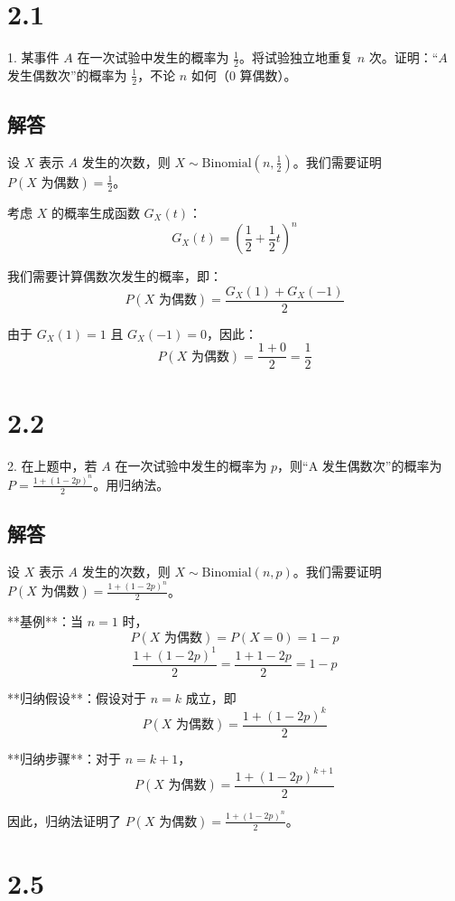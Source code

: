\documentclass[UTF8]{report}
\theoremstyle{MyLineTheoremStyle} %
\theoremstyle{MyBlockTheoremStyle} %
\theoremstyle{MySubsubsectionStyle} %
\begin{document}
\section{2.1}

1. 某事件 \(A\) 在一次试验中发生的概率为 \(\frac{1}{2}\)。将试验独立地重复 \(n\) 次。证明：“\(A\) 发生偶数次”的概率为 \(\frac{1}{2}\)，不论 \(n\) 如何（0 算偶数）。

\subsection*{解答}

设 \(X\) 表示 \(A\) 发生的次数，则 \(X \sim \text{Binomial}(n, \frac{1}{2})\)。我们需要证明 \(P(X \text{ 为偶数}) = \frac{1}{2}\)。

考虑 \(X\) 的概率生成函数 \(G_X(t)\)：
\[
G_X(t) = \left( \frac{1}{2} + \frac{1}{2}t \right)^n
\]

我们需要计算偶数次发生的概率，即：
\[
P(X \text{ 为偶数}) = \frac{G_X(1) + G_X(-1)}{2}
\]

由于 \(G_X(1) = 1\) 且 \(G_X(-1) = 0\)，因此：
\[
P(X \text{ 为偶数}) = \frac{1 + 0}{2} = \frac{1}{2}
\]

\section{2.2}

2. 在上题中，若 \(A\) 在一次试验中发生的概率为 \(p\)，则“A 发生偶数次”的概率为 \(P = \frac{1 + (1 - 2p)^n}{2}\)。用归纳法。

\subsection*{解答}

设 \(X\) 表示 \(A\) 发生的次数，则 \(X \sim \text{Binomial}(n, p)\)。我们需要证明 \(P(X \text{ 为偶数}) = \frac{1 + (1 - 2p)^n}{2}\)。

**基例**：当 \(n = 1\) 时，
\[
P(X \text{ 为偶数}) = P(X = 0) = 1 - p
\]
\[
\frac{1 + (1 - 2p)^1}{2} = \frac{1 + 1 - 2p}{2} = 1 - p
\]

**归纳假设**：假设对于 \(n = k\) 成立，即
\[
P(X \text{ 为偶数}) = \frac{1 + (1 - 2p)^k}{2}
\]

**归纳步骤**：对于 \(n = k + 1\)，
\[
P(X \text{ 为偶数}) = \frac{1 + (1 - 2p)^{k+1}}{2}
\]

因此，归纳法证明了 \(P(X \text{ 为偶数}) = \frac{1 + (1 - 2p)^n}{2}\)。

\section{2.5}
\end{document}
